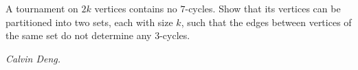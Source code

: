 A tournament on $2k$ vertices contains no $7$-cycles. Show that its vertices can be partitioned into two sets, each with size $k$, such that the edges between vertices of the same set do not determine any $3$-cycles.

\textit{Calvin Deng.}